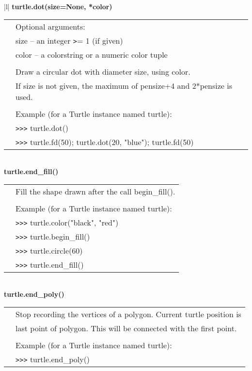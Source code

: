 \begin{center}
{\begin{tabular}{|l|}
{\bf    turtle.dot(size=None, *color)} \\
   \begin{tabular}{p{0.25in}p{4in}}
&        Optional arguments: \\
&        size -- an integer \verb+>+= 1 (if given) \\
&        color -- a colorstring or a numeric color tuple \\
&  \\
&        Draw a circular dot with diameter size, using color. \\
&        If size is not given, the maximum of pensize+4 and 2*pensize is used. \\
&  \\
&        Example (for a Turtle instance named turtle): \\
&        \verb+>+\verb+>+\verb+>+ turtle.dot() \\
&        \verb+>+\verb+>+\verb+>+ turtle.fd(50); turtle.dot(20, "blue"); turtle.fd(50) \\
\end{tabular} \\ \hline
{\bf    turtle.end\_fill()} \\
   \begin{tabular}{p{0.25in}p{4in}}
&        Fill the shape drawn after the call begin\_fill(). \\
&  \\
&        Example (for a Turtle instance named turtle): \\
&        \verb+>+\verb+>+\verb+>+ turtle.color("black", "red") \\
&        \verb+>+\verb+>+\verb+>+ turtle.begin\_fill() \\
&        \verb+>+\verb+>+\verb+>+ turtle.circle(60) \\
&        \verb+>+\verb+>+\verb+>+ turtle.end\_fill() \\
\end{tabular} \\ \hline
{\bf    turtle.end\_poly()} \\
   \begin{tabular}{p{0.25in}p{4in}}
&        Stop recording the vertices of a polygon. Current turtle position is \\
&        last point of polygon. This will be connected with the first point. \\
&  \\
&        Example (for a Turtle instance named turtle): \\
&        \verb+>+\verb+>+\verb+>+ turtle.end\_poly() \\
\end{tabular} \\ \hline

\end{tabular}}
\end{center}
